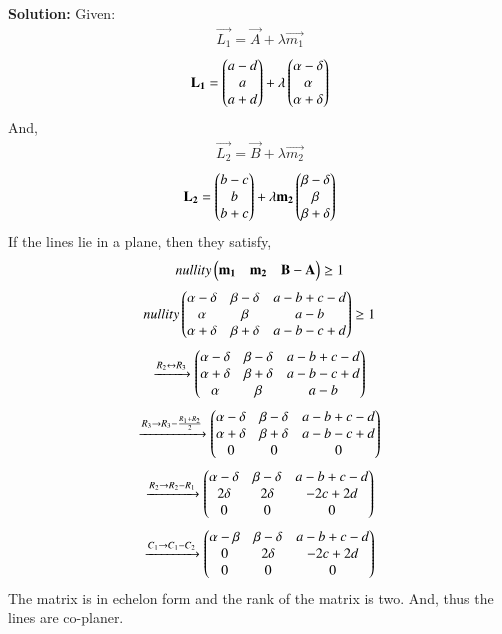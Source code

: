 \documentclass[journal,12pt,onecolumn]{IEEEtran}
\begin{document}
		\textbf{Solution:}
		Given:
		\begin{align}
				\vec{L_1} = \vec{A} + \lambda\vec{m_1}
		\end{align}
		\begin{align}
				\mathbf{L_1} = \begin{pmatrix}a-d \\a\\a+d\end{pmatrix} + \lambda
				\begin{pmatrix}\alpha - \delta\\\alpha\\\alpha + \delta \end{pmatrix}
		\end{align}And,
		\begin{align}
				\vec{L_2} = \vec{B} + \lambda\vec{m_2}
		\end{align}
		\begin{align}
				\mathbf{L_2} = \begin{pmatrix}b-c\\b\\b+c\end{pmatrix} + \lambda\mathbf{m_2}
				\begin{pmatrix}\beta - \delta\\\beta\\\beta + \delta \end{pmatrix}
		\end{align}
		If the lines lie in a plane, then they satisfy,
		\begin{align}
				nullity\begin{pmatrix}\mathbf{m_1}&\mathbf{m_2}&\mathbf{B-A}\end{pmatrix}\geq 1
		\end{align}
		\begin{align}
				nullity\begin{pmatrix}
						\alpha - \delta & \beta -\delta & a-b+c-d \\
						\alpha & \beta & a-b \\
						\alpha + \delta & \beta +\delta & a-b-c+d
				\end{pmatrix}\geq 1
		\end{align}
		\begin{align}
				\xrightarrow[]{R_2\leftrightarrow R_3}\begin{pmatrix}
						\alpha - \delta & \beta -\delta & a-b+c-d \\
						\alpha + \delta & \beta +\delta & a-b-c+d\\
						\alpha & \beta & a-b 
				\end{pmatrix}
		\end{align}
		\begin{align}
				\xrightarrow[]{R_3\rightarrow R_3-\frac{R_1+R_2}{2}}\begin{pmatrix}
						\alpha - \delta & \beta -\delta & a-b+c-d \\
						\alpha + \delta & \beta +\delta & a-b-c+d\\
						0 & 0 & 0 
				\end{pmatrix}
		\end{align}
		\begin{align}
				\xrightarrow[]{R_2\rightarrow R_2-R_1}\begin{pmatrix}
						\alpha - \delta & \beta -\delta & a-b+c-d \\
						2\delta & 2\delta & -2c+2d\\
						0 & 0 & 0 
				\end{pmatrix}
		\end{align}
		\begin{align}
				\xrightarrow[]{C_1\rightarrow C_1-C_2}\begin{pmatrix}
						\alpha - \beta & \beta -\delta & a-b+c-d \\
						0 & 2\delta & -2c+2d\\
						0 & 0 & 0 
				\end{pmatrix}
		\end{align}
		The matrix is in echelon form and the rank of the matrix is two. And, thus the lines are co-planer.
	
\end{document}

